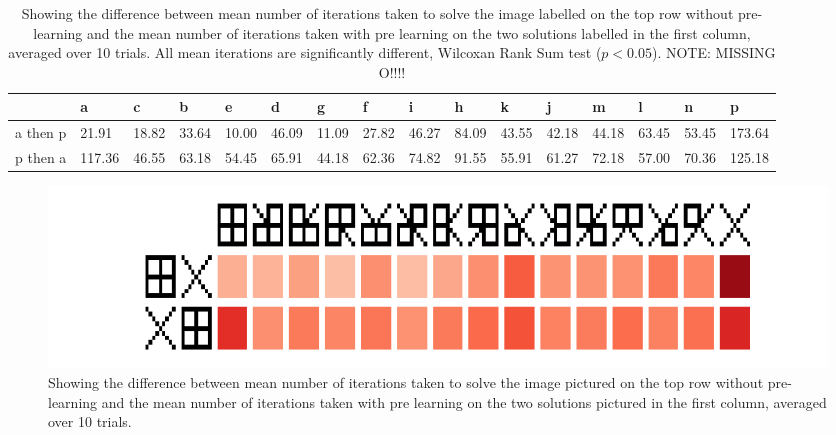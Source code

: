 \documentclass[runningheads,a4paper]{llncs}
\begin{document}
 \begin{table}[t!]
    \begin{tabular}{ | l | l | l | l | l | l | l | l | l | l | l | l | l| l| l| l|}
    \hline
    & a &c &b &e &d &g &f &i &h &k &j &m &l &n &p \\ \hline
    a then p & 21.91 & 18.82 & 33.64 & 10.00 & 46.09 & 11.09 & 27.82 & 46.27 & 84.09 & 43.55 & 42.18 & 44.18 & 63.45 & 53.45 & 173.64\\\hline
    p then a & 117.36 & 46.55 & 63.18 & 54.45 & 65.91 & 44.18 & 62.36 & 74.82 & 91.55 & 55.91 & 61.27 & 72.18 & 57.00 & 70.36 & 125.18\\\hline
    \end{tabular}
    \label{table:accumulation_results}
    \caption{Showing the difference between mean number of iterations taken to solve the image labelled on the top row without pre-learning and the mean number of iterations taken with pre learning on the two solutions labelled in the first column, averaged over 10 trials. All mean iterations are significantly different, Wilcoxan Rank Sum test (\(p<0.05\)). NOTE: MISSING O!!!!}
\end{table}

\begin{figure}[t!]
\center
\includegraphics[width = 1.0\textwidth]{images/boxy_square_cmap.png}

\caption{Showing the difference between mean number of iterations taken to solve the image pictured on the top row without pre-learning and the mean number of iterations taken with pre learning on the two solutions pictured in the first column, averaged over 10 trials.} 
\label{figure:cross_square_grid}
\end{figure}
\end{document}
